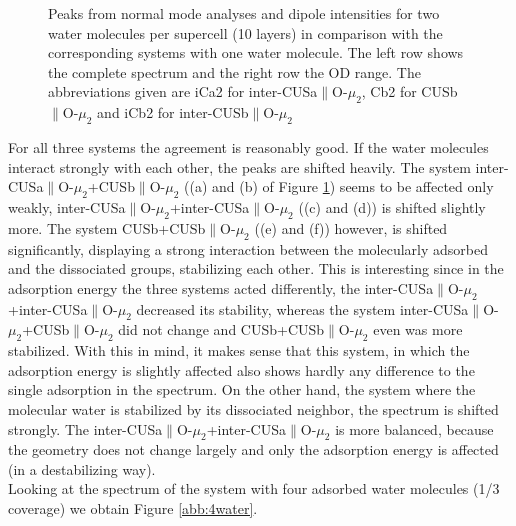 \documentclass[11pt,DIV=13,BCOR=5mm,a4paper,headinclude]{scrbook}
\begin{document}
\begin{figure}[!h]
             \quad
{}
\caption{Peaks from normal mode analyses and dipole intensities for two water molecules per supercell (10 layers) in comparison with the corresponding systems with one water molecule.
The left row shows the complete spectrum and the right row the OD range.
The abbreviations given are iCa2 for inter-CUSa$\parallel$O-$\mu_2$, Cb2 for CUSb$\parallel$O-$\mu_2$ and iCb2 for inter-CUSb$\parallel$O-$\mu_2$}
            \label{abb:2water_comp}
\end{figure}
For all three systems the agreement is reasonably good.
If the water molecules interact strongly with each other, the peaks are shifted heavily.
The system inter-CUSa$\parallel$O-$\mu_2$+CUSb$\parallel$O-$\mu_2$ ((a) and (b) of Figure \ref{abb:2water_comp}) seems to be affected only weakly, inter-CUSa$\parallel$O-$\mu_2$+inter-CUSa$\parallel$O-$\mu_2$ ((c) and (d)) is shifted slightly more.
The system CUSb+CUSb$\parallel$O-$\mu_2$ ((e) and (f)) however, is shifted  significantly, displaying a strong interaction between the molecularly adsorbed and the dissociated groups, stabilizing each other.
This is interesting since in the adsorption energy the three systems acted differently, the inter-CUSa$\parallel$O-$\mu_2$+inter-CUSa$\parallel$O-$\mu_2$ decreased its stability, whereas the system inter-CUSa$\parallel$O-$\mu_2$+CUSb$\parallel$O-$\mu_2$ did not change and CUSb+CUSb$\parallel$O-$\mu_2$ even was more stabilized.
With this in mind, it makes sense that this system, in which the adsorption energy is slightly affected also shows hardly any difference to the single adsorption in the spectrum.
On the other hand, the system where the molecular water is stabilized by its dissociated neighbor, the spectrum is shifted strongly.
The inter-CUSa$\parallel$O-$\mu_2$+inter-CUSa$\parallel$O-$\mu_2$ is more balanced, because the geometry does not change largely and only the adsorption energy is affected (in a destabilizing way).
\\
Looking at the spectrum of the system with four adsorbed water molecules (1/3 coverage) we obtain Figure \ref{abb:4water}.
\end{document}
